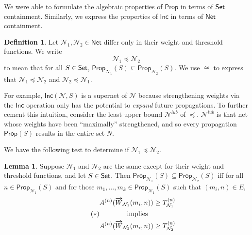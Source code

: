 \documentclass[letterpaper]{article}
\newcommand{\Set}{\mbox{\sf Set}}
\theoremstyle{definition}
\newtheorem{definition}{Definition}
\newtheorem{lemma}[theorem]{Lemma}
\newcommand{\Prop}{\textsf{Prop}}
\newcommand{\Inc}{\textsf{Inc}}
\newcommand{\AllNets}{\mathsf{Net}}
\newcommand{\Net}{\mathcal{N}}
\begin{document}
We were able to formulate the algebraic properties of $\Prop$ in terms of $\Set$ containment.  Similarly, we express the properties of $\Inc$ in terms of $\AllNets$ containment.  

\begin{definition}
Let $\Net_1, \Net_2 \in \AllNets$ differ only in their weight and threshold functions.  We write
\[
    \Net_1 \preceq \Net_2
\]
to mean that for all $S \in \Set$, $\Prop_{\Net_1}(S) \subseteq \Prop_{\Net_2}(S)$.  We use $\cong$ to express that $\Net_1 \preceq \Net_2$ and $\Net_2 \preceq \Net_1$.
\end{definition}

For example, $\Inc(\Net, S)$ is a supernet of $\Net$ because strengthening weights via the $\Inc$ operation only has the potential to \emph{expand} future propagations.  To further cement this intuition, consider the least upper bound $\mathcal{N}^{lub}$ of $\preceq$.  $\mathcal{N}^{lub}$ is that net whose weights have been ``maximally'' strengthened, and so every propagation $\Prop(S)$ results in the entire set $N$.


We have the following test to determine if $\Net_1 \preceq \Net_2$.
\begin{lemma}
\label{lemma:subnet->leq}
Suppose $\Net_1$ and $\Net_2$ are the same except for their weight and threshold functions, and let $S \in \Set$.  Then ${\Prop_{\Net_1}(S) \subseteq \Prop_{\Net_2}(S)}$ iff for all $n \in \Prop_{\Net_1}(S)$ and for those $m_1, \ldots, m_k \in \Prop_{\Net_1}(S)$ such that $(m_i, n) \in E$,
\begin{equation}\tag{$\ast$}
\label{eqn:weight-condition}
  \begin{gathered}
    A^{(n)}(\smash{\overrightarrow{W}}_{\Net_1}(m_i, n)) \geq T_{\Net_1}^{(n)} \\
    \mbox{implies} \\
    A^{(n)}(\smash{\overrightarrow{W}}_{\Net_2}(m_i, n)) \geq T_{\Net_2}^{(n)}
  \end{gathered}
\end{equation}
\end{lemma}
\end{document}
